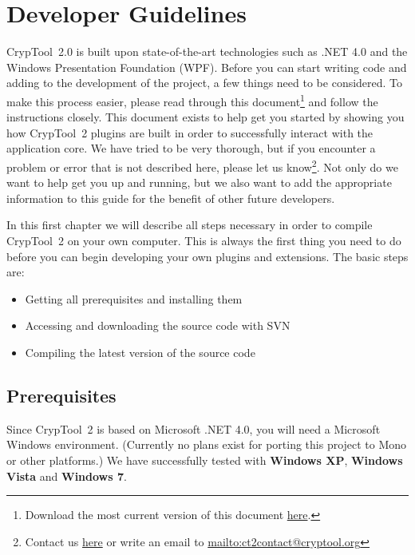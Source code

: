 \chapter{Developer Guidelines}
\label{DeveloperGuidelines}

CrypTool~2.0 is built upon state-of-the-art technologies such as .NET 4.0 and the Windows Presentation Foundation (WPF). Before you can start writing code and adding to the development of the project, a few things need to be considered. To make this process easier, please read through this document\footnote{Download the most current version of this document \href{https://www.cryptool.org/trac/CrypTool2/browser/trunk/Documentation/PluginHowTo/HowToDeveloper.pdf}{here}.} and follow the instructions closely. This document exists to help get you started by showing you how CrypTool~2 plugins are built in order to successfully interact with the application core. We have tried to be very thorough, but if you encounter a problem or error that is not described here, please let us know\footnote{Contact us \href{https://www.cryptool.org/trac/CrypTool2/wiki/DiscussionGroups}{here} or write an email to \url{mailto:ct2contact@cryptool.org}}. Not only do we want to help get you up and running, but we also want to add the appropriate information to this guide for the benefit of other future developers.

In this first chapter we will describe all steps necessary in order to compile CrypTool~2 on your own computer. This is always the first thing you need to do before you can begin developing your own plugins and extensions. The basic steps are:
\begin{itemize}
	\item Getting all prerequisites and installing them
	\item Accessing and downloading the source code with SVN
	\item Compiling the latest version of the source code
\end{itemize}

\section{Prerequisites}
\label{Prerequisites}

Since CrypTool~2 is based on Microsoft .NET 4.0, you will need a Microsoft Windows environment. (Currently no plans exist for porting this project to Mono or other platforms.) We have successfully tested with \textbf{Windows XP}, \textbf{Windows Vista} and \textbf{Windows 7}.

